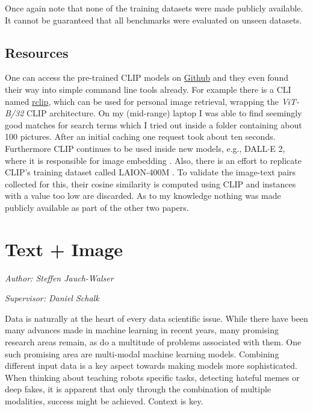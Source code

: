 \documentclass[
]{krantz}
\begin{document}
Once again note that none of the training datasets were made publicly available.
It cannot be guaranteed that all benchmarks were evaluated on unseen datasets.

\hypertarget{resources}{%
\subsection{Resources}\label{resources}}

One can access the pre-trained CLIP models on \href{https://github.com/openai/CLIP}{Github} and they even found their way into simple command line tools already.
For example there is a CLI named \href{https://github.com/yurijmikhalevich/rclip}{rclip}, which can be used for personal image retrieval, wrapping the \emph{ViT-B/32} CLIP architecture.
On my (mid-range) laptop I was able to find seemingly good matches for search terms which I tried out inside a folder containing about 100 pictures.
After an initial caching one request took about ten seconds.
Furthermore CLIP continues to be used inside new models, e.g., DALL\(\cdot\)E 2, where it is responsible for image embedding \citep{ramesh2022hierarchical}.
Also, there is an effort to replicate CLIP's training dataset called LAION-400M \citep{schuhmann2022laion}.
To validate the image-text pairs collected for this, their cosine similarity is computed using CLIP and instances with a value too low are discarded.
As to my knowledge nothing was made publicly available as part of the other two papers.

\hypertarget{c02-05-text-plus-img}{%
\section{Text + Image}\label{c02-05-text-plus-img}}

\emph{Author: Steffen Jauch-Walser }

\emph{Supervisor: Daniel Schalk}

Data is naturally at the heart of every data scientific issue. While there have been many advances made in machine learning in recent years, many promising research areas remain, as do a multitude of problems associated with them. One such promising area are multi-modal machine learning models.
Combining different input data is a key aspect towards making models more sophisticated. When thinking about teaching robots specific tasks, detecting hateful memes or deep fakes, it is apparent that only through the combination of multiple modalities, success might be achieved. Context is key.
\end{document}
